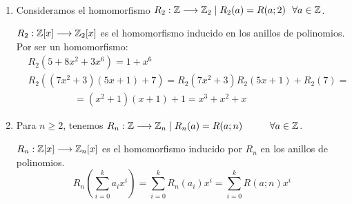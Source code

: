 \begin{ejemplo}\
    \begin{enumerate}
        \item Consideramos el homomorfismo $R_2:\mathbb Z\longrightarrow \mathbb Z_2 \mid R_2(a) = R(a;2)~~\forall a \in \mathbb Z$.
        
        $R_2:\mathbb Z[x]\longrightarrow \mathbb Z_2[x]$ es el homomorfismo inducido en los anillos de polinomios. Por ser un homomorfismo:
        \begin{equation*}
            \begin{split}
                &R_2(5+8x^2 + 3x^6) = 1 + x^6 \\
                &R_2((7x^2+3)(5x+1)+7) = R_2(7x^2+3)R_2(5x+1)+R_2(7) = \\
                & \hspace{2cm} = (x^2+1)(x+1)+1 = x^3+x^2+x
            \end{split}
        \end{equation*}

        \item Para $n \geq 2$, tenemos $R_n:\mathbb Z\longrightarrow \mathbb Z_n \mid R_n(a) = R(a;n) \hspace{1cm} \forall a \in \mathbb Z$.
        
        $R_n:\mathbb Z[x]\longrightarrow \mathbb Z_n[x]$ es el homomorfismo inducido por $R_n$ en los anillos de polinomios.
        $$R_n\left( \sum_{i=0}^k a_ix^i \right) = \sum_{i=0}^k R_n(a_i)x^i = \sum_{i=0}^k R(a;n)x^i$$
    \end{enumerate}
\end{ejemplo}
